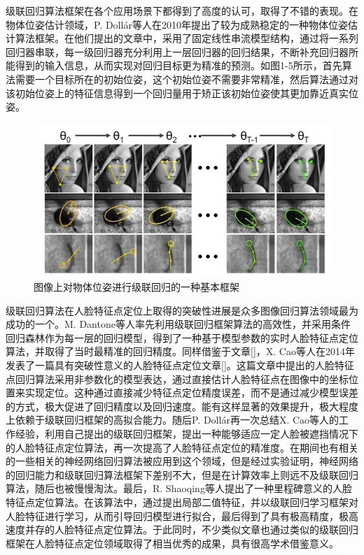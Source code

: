 级联回归算法框架在各个应用场景下都得到了高度的认可，取得了不错的表现。在物体位姿估计领域，P. Doll{\'a}r等人在2010年提出了较为成熟稳定的一种物体位姿估计算法框架\cite{dollar2010cascaded}。在他们提出的文章中，采用了固定线性串流模型结构，通过将一系列回归器串联，每一级回归器充分利用上一层回归器的回归结果，不断补充回归器所能得到的输入信息，从而实现对回归目标更为精准的预测。如图1-5所示，首先算法需要一个目标所在的初始位姿，这个初始位姿不需要非常精准，然后算法通过对该初始位姿上的特征信息得到一个回归量用于矫正该初始位姿使其更加靠近真实位姿。
\begin{figure}[htb]
	\centering 
	\includegraphics[width=\textwidth]{./mypic/级联回归.jpg} 
	\caption{图像上对物体位姿进行级联回归的一种基本框架} 
\end{figure}

级联回归算法在人脸特征点定位上取得的突破性进展是众多图像回归算法领域最为成功的一个。M. Dantone等人率先利用级联回归框架算法的高效性，并采用条件回归森林作为每一层的回归模型，得到了一种基于模型参数的实时人脸特征点定位算法，并取得了当时最精准的回归精度。同样借鉴于文章[]，X. Cao等人在2014年发表了一篇具有突破性意义的人脸特征点定位文章[]。这篇文章中提出的人脸特征点回归算法采用非参数化的模型表达，通过直接估计人脸特征点在图像中的坐标位置来实现定位。这种通过直接减少特征点定位精度误差，而不是通过减少模型误差的方式，极大促进了回归精度以及回归速度。能有这样显著的效果提升，极大程度上依赖于级联回归框架的高拟合能力。随后P. Doll{\'a}r再一次总结X. Cao等人的工作经验，利用自己提出的级联回归框架，提出一种能够适应一定人脸被遮挡情况下的人脸特征点定位算法，再一次提高了人脸特征点定位的精准度\cite{burgos2013robust}。在期间也有相关的一些相关的神经网络回归算法被应用到这个领域，但是经过实验证明，神经网络的回归能力和级联回归算法框架下差别不大，但是在计算效率上则远不及级联回归算法\cite{sun2013deep}，随后也被慢慢淘汰。最后，R. Shaoqing等人提出了一种里程碑意义的人脸特征点定位算法\cite{ren2014face}。在该算法中，通过提出局部二值特征，并以级联回归学习框架对人脸特征进行学习，从而引导回归模型进行拟合，最后得到了具有极高精度，极高速度并存的人脸特征点定位算法。于此同时，不少类似文章也通过类似的级联回归框架在人脸特征点定位领域取得了相当优秀的成果\cite{cootes2001active}\cite{saragih2009face}\cite{yang2014face}\cite{asthana2014incremental}\cite{kazemi2014one}\cite{burgos2013robust}\cite{xiong2013supervised}，具有很高学术借鉴意义。

